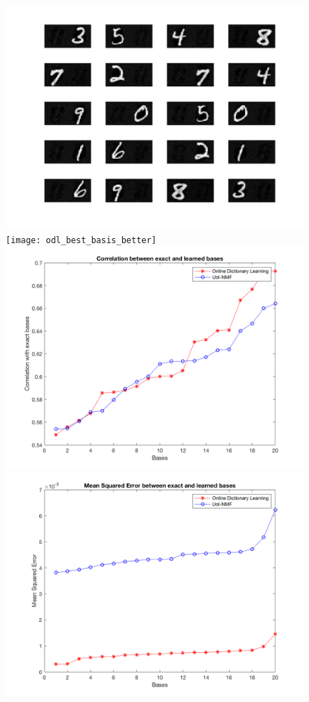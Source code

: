 \documentclass[conference]{IEEEtran}
\begin{document}

\begin{figure}[!htb]
\centering
{}
  \includegraphics[width=\linewidth]{uoi_best_basis}
\endminipage\hfill
{}
  \texttt{[image: odl\_best\_basis\_better]}
\endminipage\hfill
{}%
  \includegraphics[width=\linewidth]{corr_2in1}
\endminipage
{}%
  \includegraphics[width=\linewidth]{mse_2in1}

\end{figure}
\end{document}
